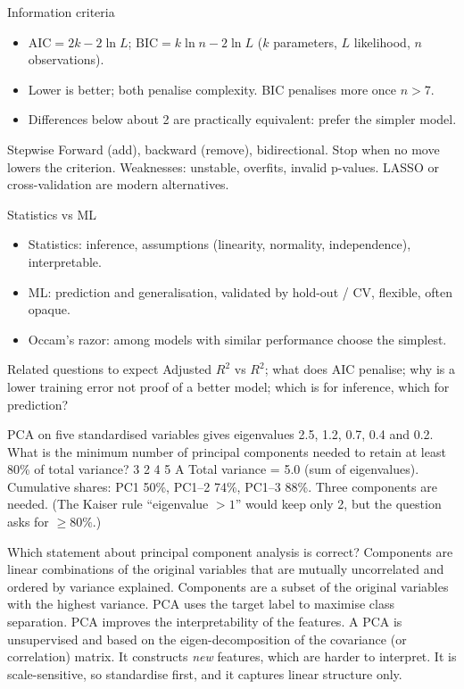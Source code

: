{\begin{block}{Information criteria}
		\begin{itemize}
			\item $\text{AIC}=2k-2\ln L$; $\text{BIC}=k\ln n-2\ln L$ ($k$ parameters, $L$ likelihood, $n$ observations).
			\item Lower is better; both penalise complexity. BIC penalises more once $n>7$.
			\item Differences below about 2 are practically equivalent: prefer the simpler model.
	\end{itemize}\end{block}
	\begin{block}{Stepwise}
		Forward (add), backward (remove), bidirectional. Stop when no move lowers the criterion. Weaknesses: unstable, overfits, invalid p-values. LASSO or cross-validation are modern alternatives.
\end{block}}
{\begin{block}{Statistics vs ML}
		\begin{itemize}
			\item Statistics: inference, assumptions (linearity, normality, independence), interpretable.
			\item ML: prediction and generalisation, validated by hold-out / CV, flexible, often opaque.
			\item Occam's razor: among models with similar performance choose the simplest.
	\end{itemize}\end{block}
	\begin{alertblock}{Related questions to expect}
		Adjusted $R^2$ vs $R^2$; what does AIC penalise; why is a lower training error not proof of a better model; which is for inference, which for prediction?
\end{alertblock}}

{PCA on five standardised variables gives eigenvalues 2.5, 1.2, 0.7, 0.4 and 0.2. What is the minimum number of principal components needed to retain at least 80\% of total variance?}
{3}
{2}
{4}
{5}
{A}
{Total variance = 5.0 (sum of eigenvalues). Cumulative shares: PC1 50\%, PC1--2 74\%, PC1--3 88\%. Three components are needed. (The Kaiser rule ``eigenvalue $>1$'' would keep only 2, but the question asks for $\ge80\%$.)}

{Which statement about principal component analysis is correct?}
{Components are linear combinations of the original variables that are mutually uncorrelated and ordered by variance explained.}
{Components are a subset of the original variables with the highest variance.}
{PCA uses the target label to maximise class separation.}
{PCA improves the interpretability of the features.}
{A}
{PCA is unsupervised and based on the eigen-decomposition of the covariance (or correlation) matrix. It constructs \emph{new} features, which are harder to interpret. It is scale-sensitive, so standardise first, and it captures linear structure only.}

